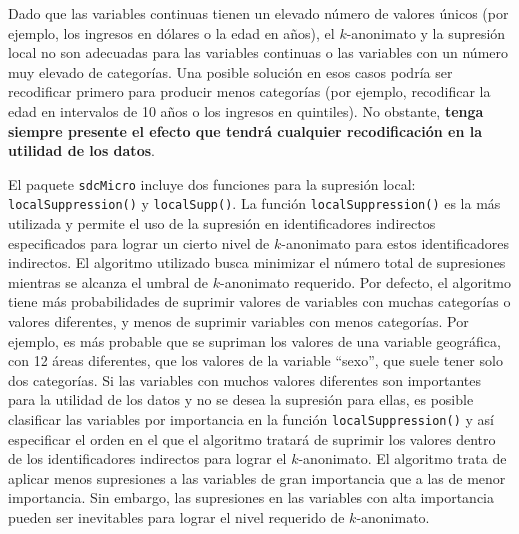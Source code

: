 \documentclass[]{book}
\theoremstyle{definition}
\theoremstyle{definition}
\theoremstyle{definition}
\theoremstyle{definition}
\theoremstyle{remark}
\begin{document}
Dado que las variables continuas tienen un elevado número de valores únicos (por ejemplo, los ingresos en dólares o la edad en años), el \(k\)-anonimato y la supresión local no son adecuadas para las variables continuas o las variables con un número muy elevado de categorías. Una posible solución en esos casos podría ser recodificar primero para producir menos categorías (por ejemplo, recodificar la edad en intervalos de 10 años o los ingresos en quintiles). No obstante, \textbf{tenga siempre presente el efecto que tendrá cualquier recodificación en la utilidad de los datos}.

El paquete \texttt{sdcMicro} incluye dos funciones para la supresión local: \texttt{localSuppression()} y \texttt{localSupp()}. La función \texttt{localSuppression()} es la más utilizada y permite el uso de la supresión en identificadores indirectos especificados para lograr un cierto nivel de \(k\)-anonimato para estos identificadores indirectos. El algoritmo utilizado busca minimizar el número total de supresiones mientras se alcanza el umbral de \(k\)-anonimato requerido. Por defecto, el algoritmo tiene más probabilidades de suprimir valores de variables con muchas categorías o valores diferentes, y menos de suprimir variables con menos categorías. Por ejemplo, es más probable que se supriman los valores de una variable geográfica, con 12 áreas diferentes, que los valores de la variable ``sexo'', que suele tener solo dos categorías. Si las variables con muchos valores diferentes son importantes para la utilidad de los datos y no se desea la supresión para ellas, es posible clasificar las variables por importancia en la función \texttt{localSuppression()} y así especificar el orden en el que el algoritmo tratará de suprimir los valores dentro de los identificadores indirectos para lograr el \(k\)-anonimato. El algoritmo trata de aplicar menos supresiones a las variables de gran importancia que a las de menor importancia. Sin embargo, las supresiones en las variables con alta importancia pueden ser inevitables para lograr el nivel requerido de \(k\)-anonimato.
\end{document}
